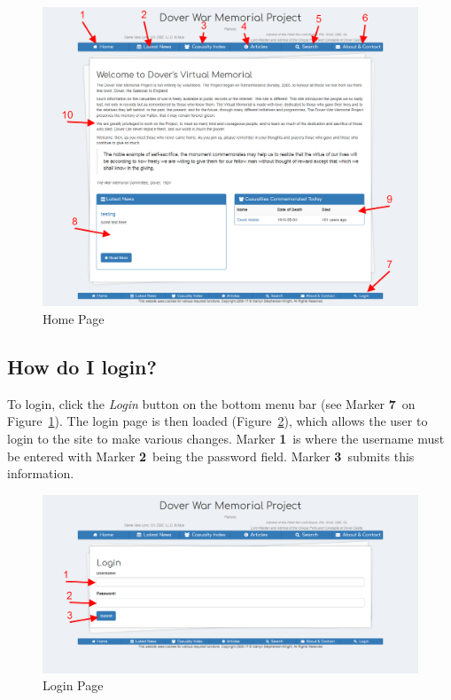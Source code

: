 \documentclass[12pt]{article}
\newcommand{\marker}[1]{Marker \color{red}\textbf{#1}\color{black}}
\begin{document}
\begin{figure}[h]
  \centering
 \includegraphics[width=.9\textwidth]{pics/home.png}
	\caption{Home Page}\label{fig:home}
\end{figure}

\newpage
\FloatBarrier
\subsection{How do I login?}\label{ssec:login}
To login, click the \textit{Login} button on the bottom menu bar (see \marker{7}\ on Figure~\ref{fig:home}). The login page is then loaded (Figure~\ref{fig:login}), which allows the user to login to the site to make various changes. \marker{1}\ is where the username must be entered with \marker{2}\ being the password field. \marker{3}\ submits this information.

\begin{figure}[h]
  \centering
 \includegraphics[width=.9\textwidth]{pics/login.png}
	\caption{Login Page}\label{fig:login}
\end{figure}
\end{document}
